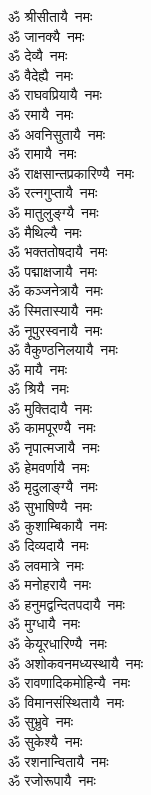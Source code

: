 \begin{multicols}{2}
\begin{flushleft}
ॐ श्रीसीतायै~नमः\\
ॐ जानक्यै~नमः\\
ॐ देव्यै~नमः\\
ॐ वैदेह्यै~नमः\\
ॐ राघवप्रियायै~नमः\\
ॐ रमायै~नमः\\
ॐ अवनिसुतायै~नमः\\
ॐ रामायै~नमः\\
ॐ राक्षसान्तप्रकारिण्यै~नमः\\
ॐ रत्नगुप्तायै~नमः\hfill{}\\
ॐ मातुलुङ्ग्यै~नमः\\
ॐ मैथिल्यै~नमः\\
ॐ भक्ततोषदायै~नमः\\
ॐ पद्माक्षजायै~नमः\\
ॐ कञ्जनेत्रायै~नमः\\
ॐ स्मितास्यायै~नमः\\
ॐ नूपुरस्वनायै~नमः\\
ॐ वैकुण्ठनिलयायै~नमः\\
ॐ मायै~नमः\\
ॐ श्रियै~नमः\hfill{}\\
ॐ मुक्तिदायै~नमः\\
ॐ कामपूरण्यै~नमः\\
ॐ नृपात्मजायै~नमः\\
ॐ हेमवर्णायै~नमः\\
ॐ मृदुलाङ्ग्यै~नमः\\
ॐ सुभाषिण्यै~नमः\\
ॐ कुशाम्बिकायै~नमः\\
ॐ दिव्यदायै~नमः\\
ॐ लवमात्रे~नमः\\
ॐ मनोहरायै~नमः\hfill{}\\
ॐ हनुमद्वन्दितपदायै~नमः\\
ॐ मुग्धायै~नमः\\
ॐ केयूरधारिण्यै~नमः\\
ॐ अशोकवनमध्यस्थायै~नमः\\
ॐ रावणादिकमोहिन्यै~नमः\\
ॐ विमानसंस्थितायै~नमः\\
ॐ सुभ्रुवे~नमः\\
ॐ सुकेश्यै~नमः\\
ॐ रशनान्वितायै~नमः\\
ॐ रजोरूपायै~नमः\hfill{}\\

\end{flushleft}
\end{multicols}
